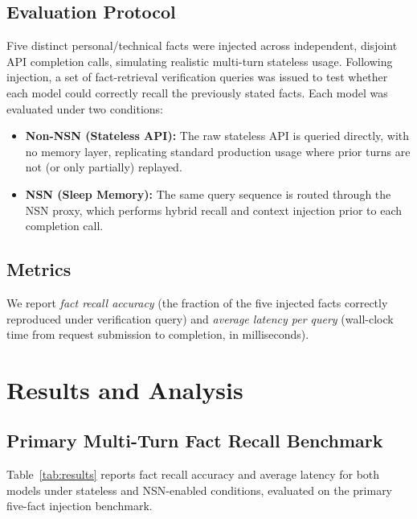 \documentclass[conference]{IEEEtran}
\begin{document}
\subsection{Evaluation Protocol}
Five distinct personal/technical facts were injected across independent, disjoint API completion calls, simulating realistic multi-turn stateless usage. Following injection, a set of fact-retrieval verification queries was issued to test whether each model could correctly recall the previously stated facts. Each model was evaluated under two conditions:
\begin{itemize}
    \item \textbf{Non-NSN (Stateless API):} The raw stateless API is queried directly, with no memory layer, replicating standard production usage where prior turns are not (or only partially) replayed.
    \item \textbf{NSN (Sleep Memory):} The same query sequence is routed through the NSN proxy, which performs hybrid recall and context injection prior to each completion call.
\end{itemize}

\subsection{Metrics}
We report \emph{fact recall accuracy} (the fraction of the five injected facts correctly reproduced under verification query) and \emph{average latency per query} (wall-clock time from request submission to completion, in milliseconds).

\section{Results and Analysis}

\subsection{Primary Multi-Turn Fact Recall Benchmark}

Table~\ref{tab:results} reports fact recall accuracy and average latency for both models under stateless and NSN-enabled conditions, evaluated on the primary five-fact injection benchmark.
\end{document}
